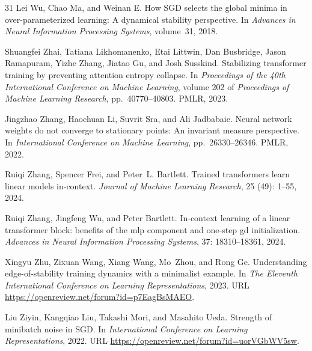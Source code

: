 \documentclass[11pt]{article}
\begin{document}
\begin{thebibliography}{31}
Lei Wu, Chao Ma, and Weinan E.
\newblock How {SGD} selects the global minima in over-parameterized learning: A
  dynamical stability perspective.
\newblock In \emph{Advances in Neural Information Processing Systems},
  volume~31, 2018.

Shuangfei Zhai, Tatiana Likhomanenko, Etai Littwin, Dan Busbridge, Jason
  Ramapuram, Yizhe Zhang, Jiatao Gu, and Josh Susskind.
\newblock Stabilizing transformer training by preventing attention entropy
  collapse.
\newblock In \emph{Proceedings of the 40th International Conference on Machine
  Learning}, volume 202 of \emph{Proceedings of Machine Learning Research},
  pp.\  40770--40803. PMLR, 2023.

Jingzhao Zhang, Haochuan Li, Suvrit Sra, and Ali Jadbabaie.
\newblock Neural network weights do not converge to stationary points: An
  invariant measure perspective.
\newblock In \emph{International Conference on Machine Learning}, pp.\
  26330--26346. PMLR, 2022.

Ruiqi Zhang, Spencer Frei, and Peter~L. Bartlett.
\newblock Trained transformers learn linear models in-context.
\newblock \emph{Journal of Machine Learning Research}, 25
  (49):\penalty0 1--55, 2024{\natexlab{a}}.

Ruiqi Zhang, Jingfeng Wu, and Peter Bartlett.
\newblock In-context learning of a linear transformer block: benefits of the
  mlp component and one-step gd initialization.
\newblock \emph{Advances in Neural Information Processing Systems},
  37:\penalty0 18310--18361, 2024{\natexlab{b}}.

Xingyu Zhu, Zixuan Wang, Xiang Wang, Mo~Zhou, and Rong Ge.
\newblock Understanding edge-of-stability training dynamics with a minimalist
  example.
\newblock In \emph{The Eleventh International Conference on Learning
  Representations}, 2023.
\newblock URL \url{https://openreview.net/forum?id=p7EagBsMAEO}.

Liu Ziyin, Kangqiao Liu, Takashi Mori, and Masahito Ueda.
\newblock Strength of minibatch noise in {SGD}.
\newblock In \emph{International Conference on Learning Representations}, 2022.
\newblock URL \url{https://openreview.net/forum?id=uorVGbWV5sw}.

\end{thebibliography}
\end{document}

